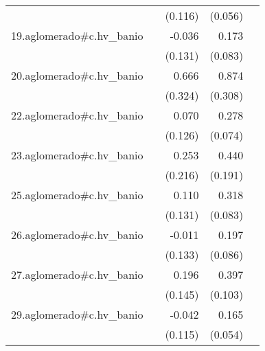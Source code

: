 {\begin{longtable}{l*{4}{D{.}{.}{-1}}}
            &                     &     (0.116)         &     (0.056)         &                     \\
\addlinespace
19.aglomerado#c.hv\_banio&                     &      -0.036         &       0.173\sym{*}  &                     \\
            &                     &     (0.131)         &     (0.083)         &                     \\
\addlinespace
20.aglomerado#c.hv\_banio&                     &       0.666\sym{*}  &       0.874\sym{**} &                     \\
            &                     &     (0.324)         &     (0.308)         &                     \\
\addlinespace
22.aglomerado#c.hv\_banio&                     &       0.070         &       0.278\sym{***}&                     \\
            &                     &     (0.126)         &     (0.074)         &                     \\
\addlinespace
23.aglomerado#c.hv\_banio&                     &       0.253         &       0.440\sym{*}  &                     \\
            &                     &     (0.216)         &     (0.191)         &                     \\
\addlinespace
25.aglomerado#c.hv\_banio&                     &       0.110         &       0.318\sym{***}&                     \\
            &                     &     (0.131)         &     (0.083)         &                     \\
\addlinespace
26.aglomerado#c.hv\_banio&                     &      -0.011         &       0.197\sym{*}  &                     \\
            &                     &     (0.133)         &     (0.086)         &                     \\
\addlinespace
27.aglomerado#c.hv\_banio&                     &       0.196         &       0.397\sym{***}&                     \\
            &                     &     (0.145)         &     (0.103)         &                     \\
\addlinespace
29.aglomerado#c.hv\_banio&                     &      -0.042         &       0.165\sym{**} &                     \\
            &                     &     (0.115)         &     (0.054)         &                     \\

\end{longtable}}
